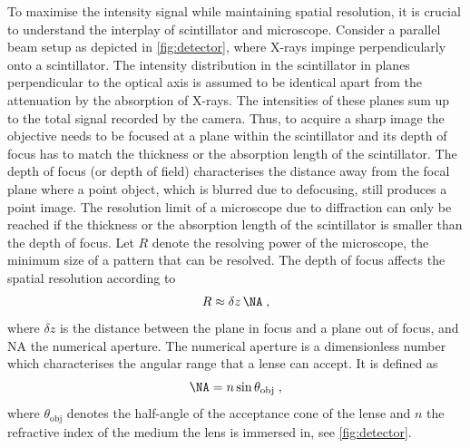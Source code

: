 \documentclass[
twoside,
openright,
titlepage,
numbers=noenddot,
headinclude,
fleqn,
a4paper,
footinclude=true,
cleardoublepage=empty,
abstractoff,
BCOR=5mm,
paper=a4,
fontsize=11pt,
british,ngerman,american,
]{scrreprt}
\begin{document}

To maximise the intensity signal while maintaining spatial resolution,
it is crucial to understand the interplay of scintillator and
microscope.  Consider a parallel beam setup as depicted in
\cref{fig:detector}, where X-rays impinge perpendicularly onto a
scintillator.  The intensity distribution in the scintillator in
planes perpendicular to the optical axis is assumed to be identical
apart from the attenuation by the absorption of X-rays.  The
intensities of these planes sum up to the total signal recorded by the
camera.  Thus, to acquire a sharp image the objective needs to be
focused at a plane within the scintillator and its depth of focus has
to match the thickness or the absorption length of the scintillator.
The depth of focus (or depth of field) characterises the distance away
from the focal plane where a point object, which is blurred due to
defocusing, still produces a point image.  The resolution limit of a
microscope due to diffraction can only be reached if the thickness or
the absorption length of the scintillator is smaller than the depth of
focus.  %
Let $R$ denote the resolving power of the microscope, \ie{} the
minimum size of a pattern that can be resolved.  The depth of focus
affects the spatial resolution according to
\cite{Hopkins1955,Koch1998}
\begin{equation}
  \label{eq:dof}
  R \approx \delta z\, \NA\;,
\end{equation}
where $\delta z$ is the distance between the plane in focus and a
plane out of focus, and NA the numerical aperture.  The numerical
aperture is a dimensionless number which characterises the angular
range that a lense can accept.  It is defined as
\begin{equation}
  \label{eq:na}
  \NA = n\sin\theta_{\mathrm{obj}}\;,
\end{equation}
where $\theta_{\mathrm{obj}}$ denotes the half-angle of the
acceptance cone of the lense and $n$ the refractive index of the
medium the lens is immersed in, see \cref{fig:detector}.
\end{document}

